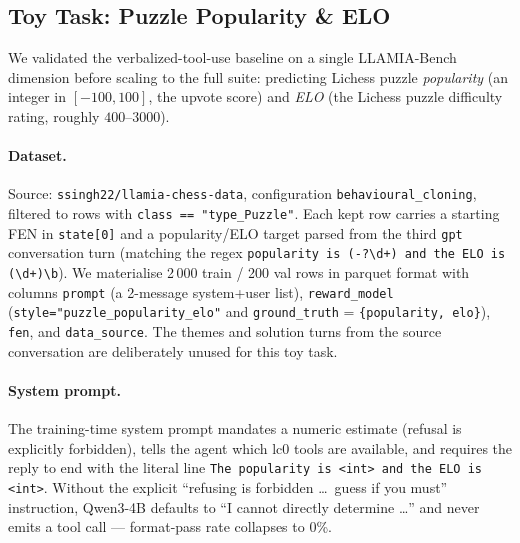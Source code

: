 \subsection{Toy Task: Puzzle Popularity \& ELO}
\label{app:details:toytask}

We validated the verbalized-tool-use baseline on a single LLAMIA-Bench
dimension before scaling to the full suite: predicting Lichess puzzle
\emph{popularity} (an integer in $[-100, 100]$, the upvote score) and
\emph{ELO} (the Lichess puzzle difficulty rating, roughly $400$--$3000$).

\paragraph{Dataset.}
Source: \texttt{ssingh22/llamia-chess-data}, configuration
\texttt{behavioural\_cloning}, filtered to rows with
\texttt{class == "type\_Puzzle"}. Each kept row carries a starting FEN in
\texttt{state[0]} and a popularity/ELO target parsed from the third
\texttt{gpt} conversation turn (matching the regex
\verb|popularity is (-?\d+) and the ELO is (\d+)\b|).
We materialise 2\,000 train / 200 val rows in parquet format with columns
\texttt{prompt} (a 2-message system+user list), \texttt{reward\_model}
(\texttt{style="puzzle\_popularity\_elo"} and \texttt{ground\_truth} =
\texttt{\{popularity, elo\}}), \texttt{fen}, and \texttt{data\_source}.
The themes and solution turns from the source conversation are
deliberately unused for this toy task.

\paragraph{System prompt.}
The training-time system prompt mandates a numeric estimate (refusal is
explicitly forbidden), tells the agent which lc0 tools are available,
and requires the reply to end with the literal line
\verb|The popularity is <int> and the ELO is <int>|. Without the explicit
``refusing is forbidden \ldots\ guess if you must'' instruction, Qwen3-4B
defaults to ``I cannot directly determine \ldots'' and never emits a tool
call --- format-pass rate collapses to 0\%.

